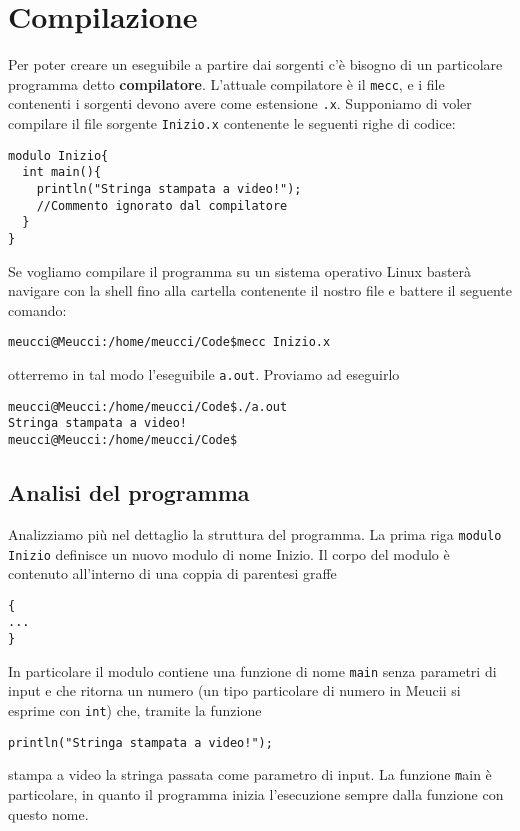 \documentclass[10pt]{book}%
\newcommand{\e}{\`{e} }
\newcommand{\code}[1]{\texttt{#1}}
\renewcommand{\emph}[1]{\textbf{#1}}
\newenvironment{codeenv}{
\begin{mdframed}[backgroundcolor=black!20,topline=false,leftline=false,rightline=false,bottomline=false]
}
{\end{mdframed}}
\begin{document}
\section{Compilazione}
Per poter creare un eseguibile a partire dai sorgenti c'\e bisogno di un particolare programma detto \emph{compilatore}. L'attuale compilatore \e il \code{mecc}, e i file contenenti i sorgenti devono avere come estensione \code{.x}. Supponiamo di voler compilare il file sorgente \code{Inizio.x} contenente le seguenti righe di codice:

\begin{codeenv}
\begin{verbatim}
modulo Inizio{
  int main(){
    println("Stringa stampata a video!");
    //Commento ignorato dal compilatore
  }
}
\end{verbatim}
\end{codeenv}

Se vogliamo compilare il programma su un sistema operativo Linux baster\`{a} navigare con la shell fino alla cartella contenente il nostro file e battere il seguente comando:

\begin{codeenv}
\begin{verbatim}
meucci@Meucci:/home/meucci/Code$mecc Inizio.x
\end{verbatim}
\end{codeenv}

otterremo in tal modo l'eseguibile \code{a.out}. Proviamo ad eseguirlo
\begin{codeenv}
\begin{verbatim}
meucci@Meucci:/home/meucci/Code$./a.out
Stringa stampata a video!
meucci@Meucci:/home/meucci/Code$
\end{verbatim}
\end{codeenv}
\subsection*{Analisi del programma}
Analizziamo pi\`{u} nel dettaglio la struttura del programma. La prima riga \code{modulo Inizio} definisce un nuovo modulo di nome Inizio. Il corpo del modulo \e contenuto all'interno di una coppia di parentesi graffe
\begin{codeenv}
\begin{verbatim}
{
...
}
\end{verbatim}
\end{codeenv}
In particolare il modulo contiene una funzione di nome \code{main} senza parametri di input e che ritorna un numero (un tipo particolare di numero in Meucii si esprime con \code{int}) che, tramite la funzione
\begin{codeenv}
\begin{verbatim}
println("Stringa stampata a video!");
\end{verbatim}
\end{codeenv}
stampa a video la stringa passata come parametro di input. La funzione \code main \e particolare, in quanto il programma inizia l'esecuzione sempre dalla funzione con questo nome.
\end{document}
